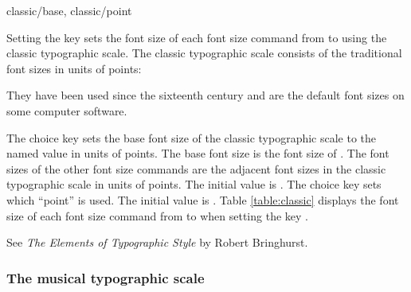 \documentclass{beerydoc}
\begin{document}
\begin{variable}{classic/base, classic/point}
  \begin{syntax}
  \end{syntax}
  Setting the key  sets the font size of each
  font size command from  to  using the classic typographic
  scale.
  The classic typographic scale consists of the traditional font sizes in units
  of points:\footnotemark
  
  They have been used since the sixteenth century and are the default font
  sizes on some computer software.

  The choice key  sets the base font size of the classic
  typographic scale to the named value in units of points.
  The base font size is the font size of .
  The font sizes of the other font size commands are the adjacent font sizes
  in the classic typographic scale in units of points.
  The initial value is .
  The choice key  sets which \enquote{point} is used.
  The initial value is .
  Table \ref{table:classic} displays the font size of each font size command
  from  to  when setting the key
  .
\end{variable}
\footnotetext
  {See \textit{The Elements of Typographic Style} by Robert Bringhurst.}



\subsubsection{The musical typographic scale}
\label{subsubsec:musicaltypographicscale}
\end{document}
